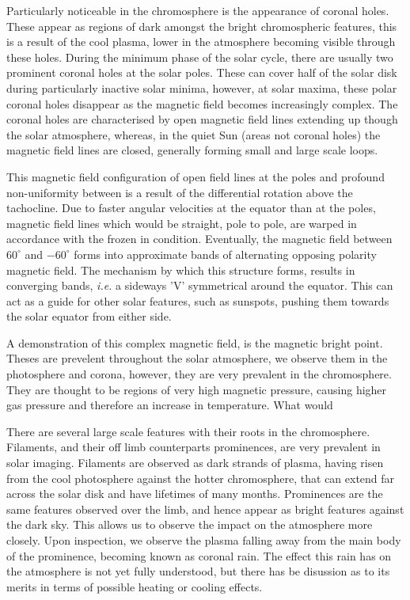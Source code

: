Particularly noticeable in the chromosphere is the appearance of coronal holes.
These appear as regions of dark amongst the bright chromospheric features, this is a result of the cool plasma, lower in the atmosphere becoming visible through these holes.
During the minimum phase of the solar cycle, there are usually two prominent coronal holes at the solar poles. 
These can cover half of the solar disk during particularly inactive solar minima, however, at solar maxima, these polar coronal holes disappear as the magnetic field becomes increasingly complex.
The coronal holes are characterised by open magnetic field lines extending up though the solar atmosphere, whereas, in the quiet Sun (areas not coronal holes) the magnetic field lines are closed, generally forming small and large scale loops.

This magnetic field configuration of open field lines at the poles and profound non-uniformity between is a result of the differential rotation above the tachocline.
Due to faster angular velocities at the equator than at the poles, magnetic field lines which would be straight, pole to pole, are warped in accordance with the frozen in condition.
Eventually, the magnetic field between $60^\circ$ and $-60^\circ$ forms into approximate bands of alternating opposing polarity magnetic field.
The mechanism by which this structure forms, results in converging bands, \emph{i.e.} a sideways 'V' symmetrical around the equator.
This can act as a guide for other solar features, such as sunspots, pushing them towards the solar equator from either side.

A demonstration of this complex magnetic field, is the magnetic bright point.
Theses are prevelent throughout the solar atmosphere, we observe them in the photosphere and corona, however, they are very prevalent in the chromosphere.
They are thought to be regions of very high magnetic pressure, causing higher gas pressure and therefore an increase in temperature.
What would 

There are several large scale features with their roots in the chromosphere.
Filaments, and their off limb counterparts prominences, are very prevalent in solar imaging.
Filaments are observed as dark strands of plasma, having risen from the cool photosphere against the hotter chromosphere, that can extend far across the solar disk and have lifetimes of many months.
Prominences are the same features observed over the limb, and hence appear as bright features against the dark sky.
This allows us to observe the impact on the atmosphere more closely. 
Upon inspection, we observe the plasma falling away from the main body of the prominence, becoming known as coronal rain.
The effect this rain has on the atmosphere is not yet fully understood, but there has be disussion as to its merits in terms of possible heating or cooling effects.

